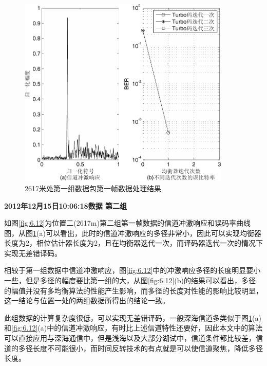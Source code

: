 \begin{figure}[htb]
  \begin{center}
    \includegraphics[width=0.9\textwidth]{images/result_2_1.pdf}
  \end{center}
  \caption{2617米处第一组数据包第一帧数据处理结果}
  \label{fig:6.11}
\end{figure}

\textbf{\sihao 2012年12月15日10:06:18数据 第二组} 

如图\ref{fig:6.12}为位置二(2617m)第二组第一帧数据的信道冲激响应和误码率曲线图，从图\ref{fig:6.11}(a)可以看出，此时的信道冲激响应的多径非常小，因此可以实现均衡器长度为2，相位估计器长度为2，且在均衡器迭代一次，而译码器迭代一次的情况下实现无差错译码。

相较于第一组数据中信道冲激响应，图\ref{fig:6.12}中的冲激响应多径的长度明显要小一些，但是多径的幅度要比第一组的大，从图\ref{fig:6.12}(b)的结果可以看出，多径的幅值并没有多均衡算法的性能产生影响，而多径的长度对性能的影响比较明显，这一结论与位置一处的两组数据所得出的结论一致。

此组数据的计算复杂度很低，可以实现无差错译码，一般深海信道多类似于图\ref{fig:6.11}(a)和\ref{fig:6.12}(a)中的信道冲激响应，有时比上述信道特性还要好，因此本文中的算法可以直接应用与深海通信中，但是浅海以及大部分湖试中，信道条件都比较差，信道的多径长度不可能很小，而时间反转技术的有点就是可以使信道聚焦，降低多径长度。

